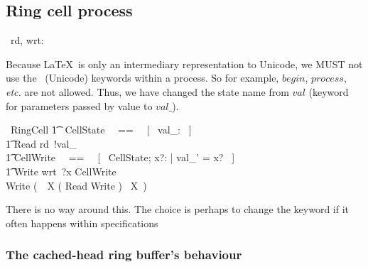 \documentclass{article}
\begin{document}
\subsection{Ring cell process}

\begin{circus}
  \circchannel\ rd, wrt: \nat
\end{circus}

Because \LaTeX\ is only an intermediary representation to Unicode,
we MUST not use the \Circus\ (Unicode) keywords within a process.
So for example, $begin$, $process$, \textit{etc.} are not allowed.
Thus, we have changed the state name from $val$ (keyword for parameters
passed by value to $val\_$).
\begin{circus}
  \circprocess\ RingCell \circdef \circbegin
  \also
    \t1 \circstate\ CellState ~~==~~ [~ val\_: \nat ~] \\
    \t1 Read \circdef rd~!val\_ \then \Skip \\
    \t1 CellWrite ~~==~~ [~ \Delta CellState; x?: \nat | val\_' = x? ~] \\
    \t1 Write \circdef wrt~?x \then CellWrite \\
    \circspot Write \circseq (~\circmu\ X \circspot ( Read \extchoice Write ) \circseq\ X~) \\
  \circend
\end{circus}
%
There is no way around this. The choice is perhaps to change the keyword
if it often happens within specifications

\subsubsection{The cached-head ring buffer's behaviour}
\end{document}
